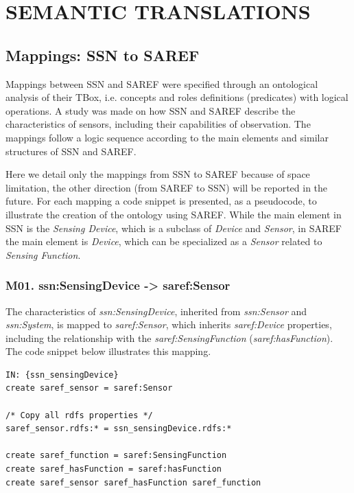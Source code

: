 \documentclass{sig-alternate-05-2015}
\begin{document}
\section{SEMANTIC TRANSLATIONS}

\subsection{Mappings: SSN to SAREF}
Mappings between SSN and SAREF were specified through an ontological analysis of their TBox, i.e. concepts and roles definitions (predicates) with logical operations. A study was made on how SSN and SAREF describe the characteristics of sensors, including their capabilities of observation. The mappings follow a logic sequence according to the main elements and similar structures of SSN and SAREF. 

Here we detail only the mappings from SSN to SAREF because of space limitation, the other direction (from SAREF to SSN) will be reported in the future. For each mapping a code snippet is presented, as a pseudocode, to illustrate the creation of the ontology using SAREF. While the main element in SSN is the \textit{Sensing Device}, which is a subclass of \textit{Device} and \textit{Sensor}, in SAREF the main element is \textit{Device}, which can be specialized as a \textit{Sensor} related to \textit{Sensing Function}. 

\subsubsection{M01. ssn:SensingDevice -> saref:Sensor}
The characteristics of \textit{ssn:SensingDevice}, inherited from \textit{ssn:Sensor} and \textit{ssn:System}, is mapped to \textit{saref:Sensor}, which inherits \textit{saref:Device} properties, including the relationship with the \textit{saref:SensingFunction} (\textit{saref:hasFunction}). The code snippet below illustrates this mapping. 

\begin{lstlisting}[caption={Pseudocode snippet for M01},label={code:sample}]
IN: {ssn_sensingDevice}  
create saref_sensor = saref:Sensor  

/* Copy all rdfs properties */ 
saref_sensor.rdfs:* = ssn_sensingDevice.rdfs:*
    
create saref_function = saref:SensingFunction  
create saref_hasFunction = saref:hasFunction  
create saref_sensor saref_hasFunction saref_function  

\end{lstlisting}
\end{document}
